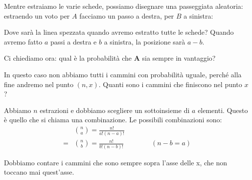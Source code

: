 \documentclass[a4paper,12pt]{book}
\begin{document}
Mentre estraiamo le varie schede, possiamo disegnare una passeggiata aleatoria: estraendo un voto per $ A $ facciamo un passo a destra, per $ B $ a sinistra:
\begin{center}
\end{center}

Dove sarà la linea spezzata quando avremo estratto tutte le schede? Quando avremo fatto $ a $ passi a destra e $ b $ a sinistra, la posizione sarà $ a-b $. 

Ci chiediamo ora: qual è la probabilità che \textbf{A} sia sempre in vantaggio?

In questo caso non abbiamo tutti i cammini con probabilità uguale, perché alla fine andremo nel punto $ (n,x) $. Quanti sono i cammini che finiscono nel punto $ x $?

Abbiamo $ n $ estrazioni e dobbiamo scegliere un sottoinsieme di $ a $ elementi. Questo è quello che si chiama una combinazione. Le possibili combinazioni sono:
\begin{align*}
	& \binom{n}{a} = \frac{n!}{a!(n-a)!} \\
    = & \binom{n}{b} = \frac{n!}{b!(n-b)!} \qquad \qquad (n-b=a)
\end{align*}

Dobbiamo contare i cammini che sono sempre sopra l'asse delle x, che non toccano mai quest'asse. 
\end{document}
